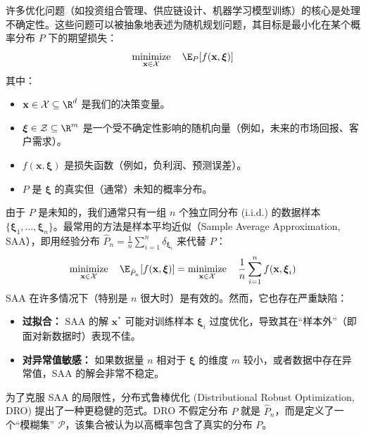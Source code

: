 \documentclass[lang=cn,newtx,10pt,scheme=chinese,chinesefont=nofont,citestyle=gb7714-2015, bibstyle=gb7714-2015]{elegantbook}
\DeclareMathOperator*{\minimize}{minimize}
\newcommand{\bx}{\mathbf{x}} %
\newcommand{\bxi}{\boldsymbol{\xi}} %
\newcommand{\Pcal}{\mathcal{P}} %
\newcommand{\Xcal}{\mathcal{X}} %
\newcommand{\Zcal}{\mathcal{Z}} %
\newcommand{\Phat}{\hat{P}_n} %
\begin{document}
\begin{refsection}

许多优化问题（如投资组合管理、供应链设计、机器学习模型训练）的核心是处理不确定性。这些问题可以被抽象地表述为随机规划问题，其目标是最小化在某个概率分布 $P$ 下的期望损失：
\begin{equation}
\label{eq:sp}
\minimize_{\bx \in \Xcal} \quad \E_{P}[f(\bx, \bxi)]
\end{equation}
其中：
\begin{itemize}
    \item $\bx \in \Xcal \subseteq \R^d$ 是我们的决策变量。
    \item $\bxi \in \Zcal \subseteq \R^m$ 是一个受不确定性影响的随机向量（例如，未来的市场回报、客户需求）。
    \item $f(\bx, \bxi)$ 是损失函数（例如，负利润、预测误差）。
    \item $P$ 是 $\bxi$ 的真实但（通常）未知的概率分布。
\end{itemize}

由于 $P$ 是未知的，我们通常只有一组 $n$ 个独立同分布 (i.i.d.) 的数据样本 $\{\bxi_1, \dots, \bxi_n\}$。最常用的方法是样本平均近似（Sample Average Approximation, SAA），即用经验分布 $\Phat = \frac{1}{n} \sum_{i=1}^n \delta_{\bxi_i}$ 来代替 $P$：
\begin{equation}
\label{eq:saa}
\minimize_{\bx \in \Xcal} \quad \E_{\Phat}[f(\bx, \bxi)] = \minimize_{\bx \in \Xcal} \quad \frac{1}{n} \sum_{i=1}^n f(\bx, \bxi_i)
\end{equation}
SAA 在许多情况下（特别是 $n$ 很大时）是有效的。然而，它也存在严重缺陷：
\begin{itemize}
    \item \textbf{过拟合：} SAA 的解 $\bx^*$ 可能对训练样本 $\bxi_i$ 过度优化，导致其在“样本外”（即面对新数据时）表现不佳。
    \item \textbf{对异常值敏感：} 如果数据量 $n$ 相对于 $\bxi$ 的维度 $m$ 较小，或者数据中存在异常值，SAA 的解会非常不稳定。
\end{itemize}

为了克服 SAA 的局限性，分布式鲁棒优化 (Distributional Robust Optimization, DRO) 提出了一种更稳健的范式。DRO 不假定分布 $P$ 就是 $\Phat$，而是定义了一个“模糊集” $\Pcal$，该集合被认为以高概率包含了真实的分布 $P$。


\end{refsection}
\end{document}
